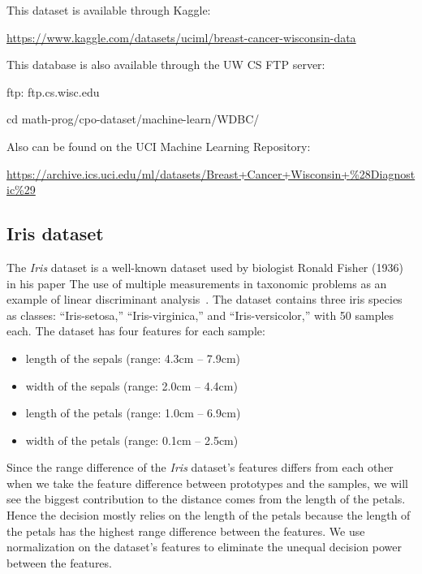 \vspace{10pt}

\noindent This dataset is available through Kaggle:

\noindent \url{https://www.kaggle.com/datasets/uciml/breast-cancer-wisconsin-data}
\vspace{10pt}

\noindent This database is also available through the UW CS FTP server:

\noindent ftp: ftp.cs.wisc.edu

\noindent cd math-prog/cpo-dataset/machine-learn/WDBC/
\vspace{10pt}

\noindent Also can be found on the UCI Machine Learning Repository:

\noindent \url{https://archive.ics.uci.edu/ml/datasets/Breast+Cancer+Wisconsin+%28Diagnostic%29}


\subsection{Iris dataset}

The \textit{Iris} dataset is a well-known dataset used by biologist Ronald Fisher (1936) in his paper The use of multiple measurements in taxonomic problems as an example of linear discriminant analysis~\cite{iris}. The dataset contains three iris species as classes: “Iris-setosa,” “Iris-virginica,” and “Iris-versicolor,” with 50 samples each. The dataset has four features for each sample:

\begin{itemize}
\item length of the sepals (range: 4.3cm – 7.9cm)
\item width of the sepals (range: 2.0cm – 4.4cm)
\item length of the petals (range: 1.0cm – 6.9cm)
\item width of the petals (range: 0.1cm – 2.5cm)
 \end{itemize}

Since the range difference of the \textit{Iris} dataset’s features differs from each other when we take the feature difference between prototypes and the samples, we will see the biggest contribution to the distance comes from the length of the petals. Hence the decision mostly relies on the length of the petals because the length of the petals has the highest range difference between the features. We use normalization on the dataset’s features to eliminate the unequal decision power between the features.


